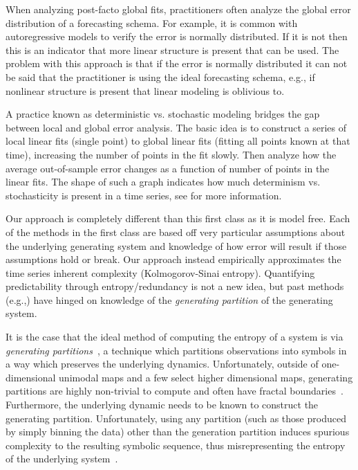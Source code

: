 


When analyzing post-facto global fits, practitioners often analyze the global error distribution of a forecasting schema. For example, it is common with autoregressive models to verify the error is normally distributed. If it is not then this is an indicator that more linear structure is present that can be used. The problem with this approach is that if the error is normally distributed it can not be said that the practitioner is using the ideal forecasting schema, e.g., if nonlinear structure is present that linear modeling is oblivious to. 


A practice known as deterministic vs. stochastic modeling\cite{Casdagli92dvsplots, weigend-book} bridges the gap between local and global error analysis. The basic idea is to construct a series of local linear fits (single point) to global linear fits (fitting all points known at that time), increasing the number of points in the fit slowly. Then analyze how the average out-of-sample error changes as a function of number of points in the linear fits. The shape of such a graph indicates how much determinism vs. stochasticity is present in a time series, see  \cite{Casdagli92dvsplots, weigend-book} for more information. 

 Our approach is completely different than this first class as it is model free. Each of the methods in the first class are based off very particular assumptions about the underlying generating system and knowledge of how error will result if those assumptions hold or break. Our approach instead empirically approximates the time series inherent complexity (Kolmogorov-Sinai entropy). Quantifying predictability through entropy/redundancy is not a new idea, but past methods (e.g.,\cite{Shannon1951, mantegna1994linguistic}) have hinged on knowledge of the \emph{generating partition} of the generating system. 
 
It is the case that the ideal method of computing the entropy of a system is via \emph{generating partitions}~\cite{lind95}, a technique which partitions observations into symbols in a way which preserves the underlying dynamics. Unfortunately, outside of one-dimensional unimodal maps and a few select higher dimensional maps, generating partitions are highly non-trivial to compute and often have fractal boundaries~\cite{eisele1999}. Furthermore, the underlying dynamic needs to be known to construct the generating partition. Unfortunately, using any partition (such as those produced by simply binning the data) other than the generation partition induces spurious complexity to the resulting symbolic sequence, thus misrepresenting the entropy of the underlying system~\cite{bollt2001}.

